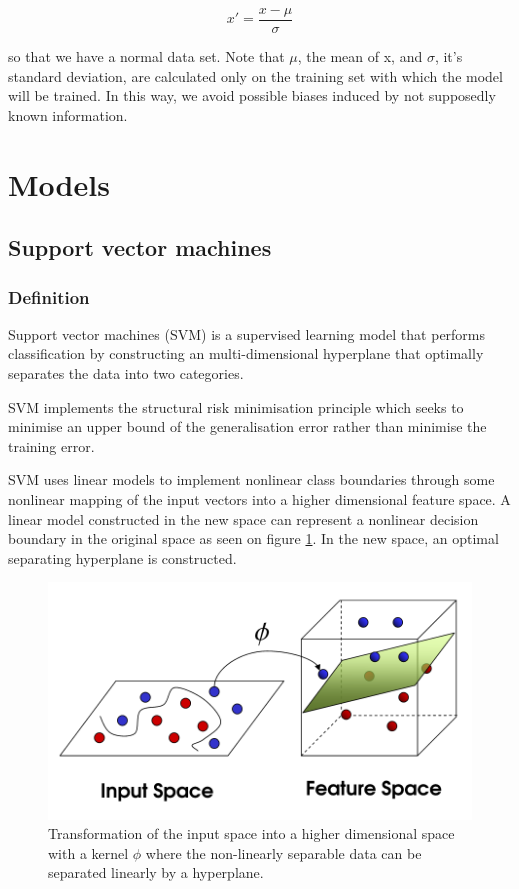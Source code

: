 \documentclass[11pt,a4paper,oneside]{book}
\begin{document}
\begin{equation}
{x}' = \frac{x - \mu }{\sigma }
\end{equation}

so that we have a normal data set. Note that $\mu$, the mean of x, and $\sigma$, it's standard deviation, are calculated only on the training set with which the model will be trained. In this way, we avoid possible biases induced by not supposedly known information.




\section{Models}

\subsection{Support vector machines}

\subsubsection{Definition}

Support vector machines (SVM) is a supervised learning model that performs classification by constructing an multi-dimensional hyperplane that optimally separates the data into two categories. 

SVM implements the structural risk minimisation principle which seeks to minimise an upper bound of the generalisation error rather than minimise the training error.

SVM uses linear models to implement nonlinear class boundaries through some nonlinear mapping of the input vectors into a higher dimensional feature space. A linear model constructed in the new space can represent a nonlinear decision boundary in the original space as seen on figure \ref{fig:svm}. In the new space, an optimal separating hyperplane is constructed. \cite{kim}\cite{liwang}\cite{Smola}


\begin{figure}[!h]
  \centering
    \includegraphics[scale=0.45]{img/svm.png}
  \caption{Transformation of the input space into a higher dimensional space with a kernel $\phi$ where the non-linearly separable data can be separated linearly by a hyperplane.}
  \label{fig:svm}
\end{figure}
\end{document}
